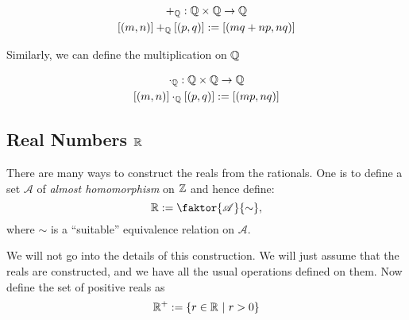 \begin{definition}[Addition on \(\Q\)]
	\begin{equation}
		\begin{gathered}
			+_{\mathbb Q}: \mathbb Q \times \mathbb Q \to \mathbb Q \\
			[(m, n)] +_{\mathbb Q} [(p, q)] := [(m q + n p, n q)]
		\end{gathered}
	\end{equation}
\end{definition}
Similarly, we can define the multiplication on \(\Q\)
\begin{definition}[Multiplication on \(\Q\)]
	\begin{equation}
		\begin{gathered}
			\cdot_{\mathbb Q}: \mathbb Q \times \mathbb Q \to \mathbb Q \\
			[(m, n)] \cdot_{\mathbb Q} [(p, q)] := [(m p, n q)]
		\end{gathered}
	\end{equation}
\end{definition}

\subsection[Real Numbers]{Real Numbers \(\mathbb R\)}
There are many ways to construct the reals from the rationals. One is to define a set $\mathscr{A}$ of \emph{almost homomorphism} on $\mathbb Z$ and hence define:
\begin{equation}
	\R := \faktor{\mathscr{A}}{\sim},
\end{equation}
where $\sim$ is a ``suitable'' equivalence relation on $\mathscr{A}$.

We will not go into the details of this construction. We will just assume that the reals are constructed, and we have all the usual operations defined on them. Now define the set of positive reals as
\begin{equation}
	\mathbb R^+ := \qty{r \in \mathbb R\ \middle|\ r > 0}
\end{equation}


